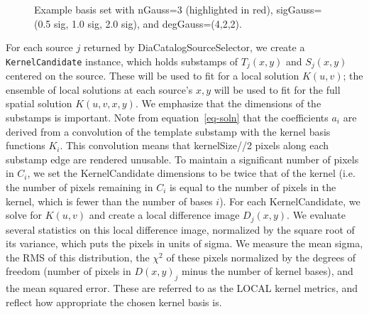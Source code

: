 \documentclass[prd, nofootinbib, floatfix, 11pt,tightenlines,times]{article}
\begin{document}
\begin{figure}
\caption{Example basis set with nGauss=3 (highlighted in red),
  sigGauss=(0.5 sig, 1.0 sig, 2.0 sig), and degGauss=(4,2,2).}
\label{basis}
\end{figure}

For each source $j$ returned by DiaCatalogSourceSelector, we create a
{\tt KernelCandidate} instance, which holds substamps of $T_j(x,y)$
and $S_j(x,y)$ centered on the source.  These will be used to fit for
a local solution $K(u,v)$; the ensemble of local solutions at each
source's $x,y$ will be used to fit for the full spatial solution
$K(u,v,x,y)$.  We emphasize that the dimensions of the substamps is
important.  Note from equation~\ref{eq-soln} that the coefficients
$a_i$ are derived from a convolution of the template substamp with the
kernel basis functions $K_i$.  This convolution means that
kernelSize//2 pixels along each substamp edge are rendered unusable.
To maintain a significant number of pixels in $C_i$, we set the
KernelCandidate dimensions to be twice that of the kernel (i.e. the
number of pixels remaining in $C_i$ is equal to the number of pixels
in the kernel, which is fewer than the number of bases $i$).  For each
KernelCandidate, we solve for $K(u,v)$ and create a local difference
image $D_j(x,y)$.  We evaluate several statistics on this local
difference image, normalized by the square root of its variance, which
puts the pixels in units of sigma.  We measure the mean sigma, the RMS
of this distribution, the $\chi^2$ of these pixels normalized by the
degrees of freedom (number of pixels in $D(x,y)_j$ minus the number of
kernel bases), and the mean squared error.  These are referred to as
the LOCAL kernel metrics, and reflect how appropriate the chosen
kernel basis is.
\end{document}

